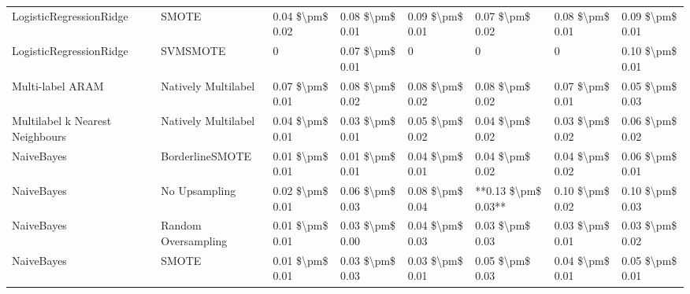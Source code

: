 \begin{tabular}{llllllll}
        LogisticRegressionRidge &                         SMOTE & 0.04 \$\textbackslash pm\$ 0.02 &           0.08 \$\textbackslash pm\$ 0.01 &       0.09 \$\textbackslash pm\$ 0.01 &        0.07 \$\textbackslash pm\$ 0.02 &                         0.08 \$\textbackslash pm\$ 0.01 &     0.09 \$\textbackslash pm\$ 0.01 \\
        LogisticRegressionRidge &                      SVMSMOTE &               0 &           0.07 \$\textbackslash pm\$ 0.01 &                     0 &                      0 &                                       0 &     0.10 \$\textbackslash pm\$ 0.01 \\
               Multi-label ARAM &           Natively Multilabel & 0.07 \$\textbackslash pm\$ 0.01 &           0.08 \$\textbackslash pm\$ 0.02 &       0.08 \$\textbackslash pm\$ 0.02 &        0.08 \$\textbackslash pm\$ 0.02 &                         0.07 \$\textbackslash pm\$ 0.01 &     0.05 \$\textbackslash pm\$ 0.03 \\
Multilabel k Nearest Neighbours &           Natively Multilabel & 0.04 \$\textbackslash pm\$ 0.01 &           0.03 \$\textbackslash pm\$ 0.01 &       0.05 \$\textbackslash pm\$ 0.02 &        0.04 \$\textbackslash pm\$ 0.02 &                         0.03 \$\textbackslash pm\$ 0.02 &     0.06 \$\textbackslash pm\$ 0.02 \\
                     NaiveBayes &               BorderlineSMOTE & 0.01 \$\textbackslash pm\$ 0.01 &           0.01 \$\textbackslash pm\$ 0.01 &       0.04 \$\textbackslash pm\$ 0.01 &        0.04 \$\textbackslash pm\$ 0.02 &                         0.04 \$\textbackslash pm\$ 0.02 &     0.06 \$\textbackslash pm\$ 0.01 \\
                     NaiveBayes &                 No Upsampling & 0.02 \$\textbackslash pm\$ 0.01 &           0.06 \$\textbackslash pm\$ 0.03 &       0.08 \$\textbackslash pm\$ 0.04 &    **0.13 \$\textbackslash pm\$ 0.03** &                         0.10 \$\textbackslash pm\$ 0.02 &     0.10 \$\textbackslash pm\$ 0.03 \\
                     NaiveBayes &           Random Oversampling & 0.01 \$\textbackslash pm\$ 0.01 &           0.03 \$\textbackslash pm\$ 0.00 &       0.04 \$\textbackslash pm\$ 0.03 &        0.03 \$\textbackslash pm\$ 0.03 &                         0.03 \$\textbackslash pm\$ 0.01 &     0.03 \$\textbackslash pm\$ 0.02 \\
                     NaiveBayes &                         SMOTE & 0.01 \$\textbackslash pm\$ 0.01 &           0.03 \$\textbackslash pm\$ 0.03 &       0.03 \$\textbackslash pm\$ 0.01 &        0.05 \$\textbackslash pm\$ 0.03 &                         0.04 \$\textbackslash pm\$ 0.01 &     0.05 \$\textbackslash pm\$ 0.01 \\

\end{tabular}
